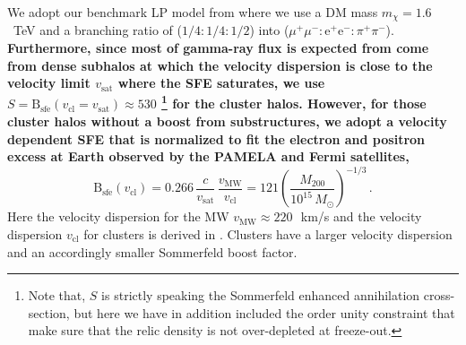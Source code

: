 \documentclass[10pt,aps,pra,reprint,amsmath,amsfonts,amssymb,showpacs,nofootinbib,floatfix]{revtex4-1}
\def\del#1{{}}
\def\C#1{{\bf #1}}
\newcommand{\rmn}{\mathrm}
\newcommand{\sfe}{\rmn{sfe}}
\newcommand{\msun}{M_\odot}
\newcommand{\B}{\rmn{B}}
\newcommand{\sigv}{v_\rmn{cl}}
\newcommand{\mvir}{M_{200}}
\newcommand{\e}{\rmn{e}}
\begin{document}
We adopt our benchmark LP model from \cite{Finkbeiner:2010sm} where we
use a DM mass $m_\chi=1.6$~TeV and a branching ratio of
($1/4:1/4:1/2$) into
($\mu^+\mu^-:\e^+\e^-:\pi^+\pi^-$). \del{\footnote{This is an
    approximation to the model found in \cite{Finkbeiner:2010sm} that
    has a branching ratio of ($1/4:1/4:1/2$) into
    ($\mu^+\mu^-:\e^+\e^-:\pi^+\pi^-$).}} \C{Furthermore, since most
  of gamma-ray flux is expected from come from dense subhalos at which
  the velocity dispersion is close to the velocity limit $v_\rmn{sat}$
  where the SFE saturates, we use $S=\B_\sfe(\sigv=v_\rmn{sat})\approx
  530$ \footnote{Note that, $S$ is strictly speaking the Sommerfeld
    enhanced annihilation cross-section, but here we have in addition
    included the order unity constraint that make sure that the relic
    density is not over-depleted at freeze-out.} for the cluster
  halos. However, for those cluster halos without a boost from
  substructures, we adopt a velocity dependent SFE that is normalized
  to fit the electron and positron excess at Earth observed by the
  PAMELA and Fermi satellites,}
\begin{equation}
\B_\sfe(\sigv) = 0.266\, \frac{c}{v_\rmn{sat}}\, \frac{v_\rmn{MW}}{\sigv} = 
121 \left(\frac{\mvir}{10^{15}\,\msun}\right)^{-1/3}\,.
\label{eq:B_sfe}
\end{equation}
Here the velocity dispersion for the MW $v_\rmn{MW} \approx
220\,$~km/s and the velocity dispersion $\sigv$ for clusters is
derived in \cite{2005RvMP...77..207V}. Clusters have a larger velocity
dispersion and an accordingly smaller Sommerfeld boost factor.
\end{document}

